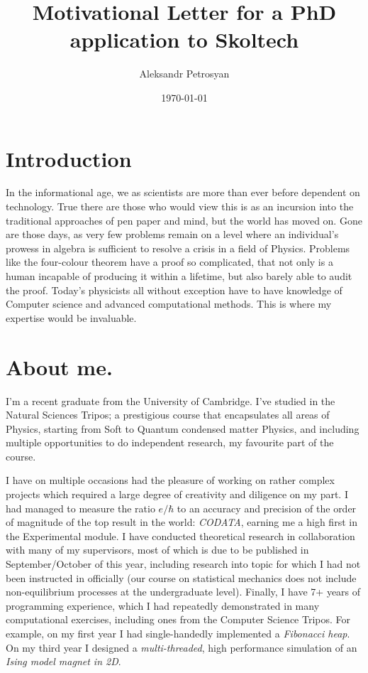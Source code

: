 \documentclass[a4paper, twocolumn]{article}
\author{Aleksandr Petrosyan}
\date{\today}
\title{Motivational Letter for a PhD application to Skoltech}
\begin{document}
\maketitle
\section{Introduction}
\label{sec:org3d65b1f}
In the informational age, we as scientists are more than ever before
dependent on technology. True there are those who would view this is
as an incursion into the traditional approaches of pen paper and
mind, but the world has moved on. Gone are those days, as very few
problems remain on a level where an individual's prowess in algebra
is sufficient to resolve a crisis in a field of Physics. Problems
like the four-colour theorem have a proof so complicated, that not
only is a human incapable of producing it within a lifetime, but
also barely able to audit the proof. Today's physicists all without
exception have to have knowledge of Computer science and advanced
computational methods. This is where my expertise would be
invaluable.
\section{About me.}
\label{sec:org535a41d}

I'm a recent graduate from the University of Cambridge. I've studied
in the Natural Sciences Tripos; a prestigious course that
encapsulates all areas of Physics, starting from Soft to Quantum
condensed matter Physics, and including multiple opportunities to do
independent research, my favourite part of the course. 

I have on multiple occasions had the pleasure of working on rather
complex projects which required a large degree of creativity and
diligence on my part. I had managed to measure the ratio \(e /
  \hbar\) to an accuracy and precision of the order of magnitude of
the top result in the world: \emph{CODATA}, earning me a high first in the
Experimental module. I have conducted theoretical research in
collaboration with many of my supervisors, most of which is due to
be published in September/October of this year, including research
into topic for which I had not been instructed in officially (our
course on statistical mechanics does not include non-equilibrium
processes at the undergraduate level). Finally, I have 7+ years of
programming experience, which I had repeatedly demonstrated in many
computational exercises, including ones from the Computer Science
Tripos. For example, on my first year I had single-handedly
implemented a \emph{Fibonacci heap}. On my third year I designed a
\emph{multi-threaded}, high performance simulation of an \emph{Ising model
magnet in 2D}. 
\end{document}
